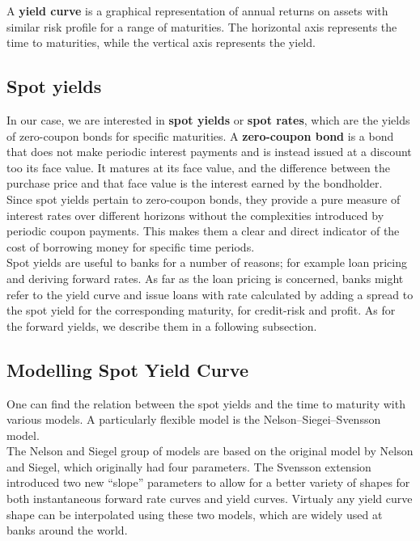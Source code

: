 \documentclass[11pt]{report}
\begin{document}
A \textbf{yield curve} is a graphical representation of annual returns on assets with similar risk profile for a range of maturities. The horizontal axis represents the time to maturities, while the vertical axis represents the yield.

\subsection{Spot yields}

 In our case, we are interested in \textbf{spot yields} or \textbf{spot rates}, which are the yields of zero-coupon bonds for specific maturities. A \textbf{zero-coupon bond} is a bond that does not make periodic interest payments and is instead issued at a discount too its face value. It matures at its face value, and the difference between the purchase price and that face value is the interest earned by the bondholder.\\
 
 Since spot yields pertain to zero-coupon bonds, they provide a pure measure of interest rates over different horizons without the complexities introduced by periodic coupon payments. This makes them a clear and direct indicator of the cost of borrowing money for specific time periods. \\
 
  Spot yields are useful to banks for a number of reasons; for example loan pricing and deriving forward rates. As far as the loan pricing is concerned, banks might refer to the yield curve and issue loans with rate calculated by adding a spread to the spot yield for the corresponding maturity, for credit-risk and profit. As for the forward yields, we describe them in a following subsection.


\subsection{Modelling Spot Yield Curve}

One can find the relation between the spot yields and the time to maturity with various models. A particularly flexible model is the  Nelson--Siegei--Svensson model. \\

The Nelson and Siegel group of models are based on the original model by Nelson and Siegel, which originally had four parameters. The Svensson extension introduced two new “slope” parameters to allow for a better variety of shapes for both instantaneous forward rate curves and yield curves.  Virtualy any yield curve shape can be interpolated using these two models, which are widely used at banks around the world.\\
\end{document}
